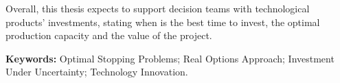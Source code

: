 Overall, this thesis expects to support decision teams with technological products' investments, stating when is the best time to invest, the optimal production capacity and the value of the project.




\vfill

\textbf{\Large Keywords:} Optimal Stopping Problems; Real Options Approach; Investment Under Uncertainty; Technology Innovation.

